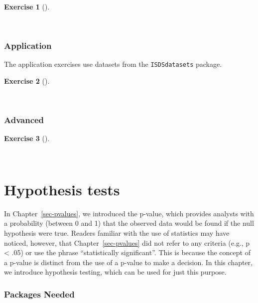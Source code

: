 \documentclass[
  letterpaper,
  DIV=11,
  numbers=noendperiod]{scrreprt}
\theoremstyle{definition}
\newtheorem{exercise}{Exercise}[chapter]
\theoremstyle{remark}
\begin{document}
\begin{exercise}[]\protect\hypertarget{exr-ch11-c01}{}\label{exr-ch11-c01}

~

\end{exercise}

\hypertarget{sec-ex11-application}{%
\subsection{Application}\label{sec-ex11-application}}

The application exercises use datasets from the \texttt{ISDSdatasets}
package.

\begin{exercise}[]\protect\hypertarget{exr-ch11-app1}{}\label{exr-ch11-app1}

~

\end{exercise}

\hypertarget{sec-ex11-advanced}{%
\subsection{Advanced}\label{sec-ex11-advanced}}

\begin{exercise}[]\protect\hypertarget{exr-ch11-adv1}{}\label{exr-ch11-adv1}

~

\end{exercise}

\hypertarget{sec-hypothesis-tests}{%
\chapter{Hypothesis tests}\label{sec-hypothesis-tests}}

In Chapter~\ref{sec-pvalues}, we introduced the p-value, which provides
analysts with a probability (between 0 and 1) that the observed data
would be found if the null hypothesis were true. Readers familiar with
the use of statistics may have noticed, however, that
Chapter~\ref{sec-pvalues} did not refer to any criteria (e.g., p
\textless{} .05) or use the phrase ``statistically significant''. This
is because the concept of a p-value is distinct from the use of a
p-value to make a decision. In this chapter, we introduce hypothesis
testing, which can be used for just this purpose.

\hypertarget{packages-needed-5}{%
\subsection*{Packages Needed}\label{packages-needed-5}}
\end{document}
